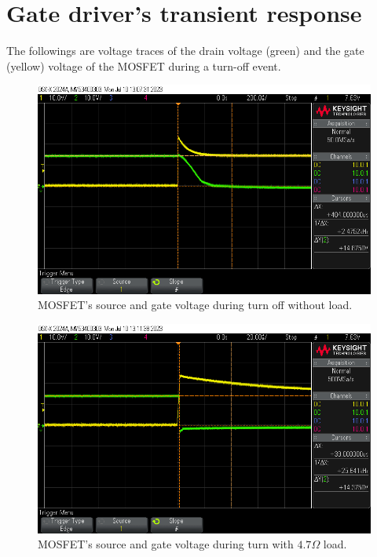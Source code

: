 \documentclass[../main.tex]{subfiles}
\begin{document}
    \section{Gate driver's transient response} \label{sec:result_gate_driver}
    \justify
    The followings are voltage traces of the drain voltage (green) and the gate (yellow) voltage of the MOSFET during a turn-off event.

    \begin{figure}[!h]
        \centerline{\includegraphics[scale=0.5]{media/turn_off_no_load.png}}
        \caption{MOSFET's source and gate voltage during turn off without load.}
        \label{fig:turn_off_no_load}
    \end{figure}

    \begin{figure}[!h]
        \centerline{\includegraphics[scale=0.5]{media/turn_off_4_7_load.png}}
        \caption{MOSFET's source and gate voltage during turn with $4.7\Omega$ load.}
        \label{fig:turn_off_4_7_load}
    \end{figure}
\end{document}
